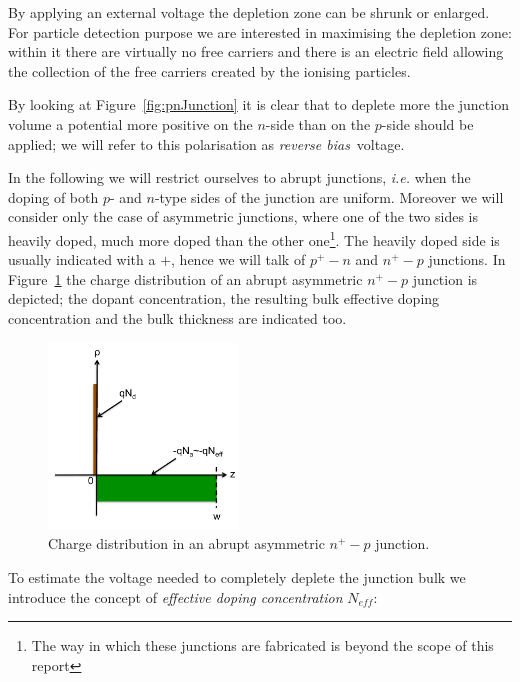 By applying an external voltage the depletion zone can be shrunk or enlarged. For particle detection 
purpose we are interested in maximising the depletion zone: within it there are virtually no 
free carriers and there is an electric field 
allowing the collection of the free carriers created by the ionising particles. 

By looking at Figure~\ref{fig:pnJunction} it is clear that to deplete more the junction volume 
a potential more positive on the $n$-side than on the $p$-side should be applied; we will refer 
to this polarisation as {\it reverse bias}~voltage.

In the following we will restrict ourselves to abrupt junctions, {\it i.e.} when the doping of both $p$- 
and $n$-type sides of the junction are uniform. Moreover we will consider only the case of 
asymmetric junctions, where one of the two sides is heavily doped, much more doped than the 
other one\footnote{The way in which these junctions are fabricated is beyond the scope of this 
report}. The heavily doped side is usually indicated with a $+$, hence we will talk of 
$p^+-n$ and $n^+-p$ junctions. In Figure~\ref{fig:AAJunction} the charge distribution of 
an abrupt asymmetric $n^+-p$ junction is depicted; the dopant concentration, the 
resulting bulk effective doping concentration and the bulk thickness are indicated too.

\begin{figure}[htbp]
   \centering
   \includegraphics[width=0.45\textwidth]{Abrupt_Junction.pdf} 
      \caption{\label{fig:AAJunction}Charge distribution in an abrupt asymmetric $n^+-p$ junction.}
\end{figure}

To estimate the voltage needed to completely deplete the junction bulk we introduce the concept 
of {\it effective doping concentration} $N_{eff}$:

